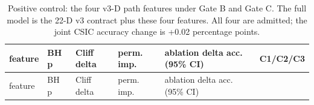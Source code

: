 \documentclass[preprint,11pt]{elsarticle}
\begin{document}
{
\begingroup\scriptsize\setlength{\tabcolsep}{2pt}
\begin{longtable}[]{@{}
  >{\raggedright\arraybackslash}p{}
  >{\raggedright\arraybackslash}p{}
  >{\raggedleft\arraybackslash}p{}
  >{\raggedleft\arraybackslash}p{}
  >{\raggedleft\arraybackslash}p{}
  >{\raggedleft\arraybackslash}p{}@{}}
\caption{Positive control: the four v3-D path features under
Gate B and Gate C. The full model is the 22-D v3 contract plus these
four features. All four are admitted; the joint CSIC accuracy change is
+0.02 percentage points.}\label{tab:positive-control}\\
\toprule\noalign{}
\begin{minipage}[t]{\linewidth}\raggedright
feature
\end{minipage} & \begin{minipage}[t]{\linewidth}\raggedleft
BH p
\end{minipage} & \begin{minipage}[t]{\linewidth}\raggedleft
Cliff delta
\end{minipage} & \begin{minipage}[t]{\linewidth}\raggedleft
perm. imp.
\end{minipage} & \begin{minipage}[t]{\linewidth}\raggedright
ablation delta acc. (95\% CI)
\end{minipage} & \begin{minipage}[t]{\linewidth}\raggedright
C1/C2/C3
\end{minipage} \\
\midrule\noalign{}
\endfirsthead
\toprule\noalign{}
\begin{minipage}[t]{\linewidth}\raggedright
feature
\end{minipage} & \begin{minipage}[t]{\linewidth}\raggedleft
BH p
\end{minipage} & \begin{minipage}[t]{\linewidth}\raggedleft
Cliff delta
\end{minipage} & \begin{minipage}[t]{\linewidth}\raggedleft
perm. imp.
\end{minipage} & \begin{minipage}[t]{\linewidth}\raggedright
ablation delta acc. (95\% CI)

\end{minipage}
\end{longtable}}
\end{document}
